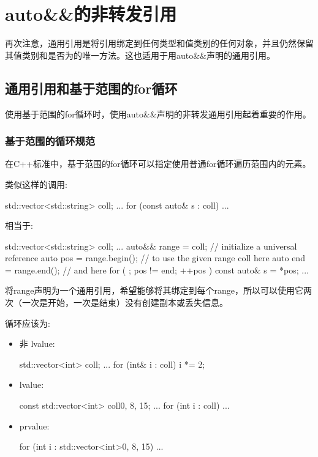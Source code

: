 \section{auto\&\&的非转发引用}
再次注意，通用引用是将引用绑定到任何类型和值类别的任何对象，并且仍然保留其值类别和是否为的唯一方法。这也适用于用auto\&\&声明的通用引用。

\subsection{通用引用和基于范围的for循环}

使用基于范围的for循环时，使用auto\&\&声明的非转发通用引用起着重要的作用。

\subsubsection{基于范围的循环规范}

在C++标准中，基于范围的for循环可以指定使用普通for循环遍历范围内的元素。

类似这样的调用:

\begin{cppcode}
std::vector<std::string> coll;
...
for (const auto& s : coll) {
	...
}
\end{cppcode}

相当于:

\begin{cppcode}
std::vector<std::string> coll;
...
auto&& range = coll; // initialize a universal reference
auto pos = range.begin(); // to use the given range coll here
auto end = range.end(); // and here
for ( ; pos != end; ++pos ) {
	const auto& s = *pos;
	...
}
\end{cppcode}

将range声明为一个通用引用，希望能够将其绑定到每个range，所以可以使用它两次（一次是开始，一次是结束）没有创建副本或丢失信息。

循环应该为:

\begin{itemize}
\item 非 lvalue:
\begin{cppcode}
std::vector<int> coll;
...
for (int& i : coll) {
	i *= 2;
}
\end{cppcode}
\item {} lvalue:
\begin{cppcode}
const std::vector<int> coll{0, 8, 15};
...
for (int i : coll) {
	...
}
\end{cppcode}
\item prvalue:
\begin{cppcode}
for (int i : std::vector<int>{0, 8, 15}) {
	...
}
\end{cppcode}
\end{itemize}

